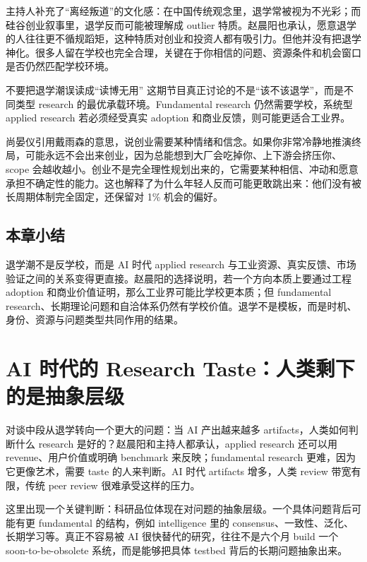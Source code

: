 \documentclass[a4paper]{article}
\begin{document}
主持人补充了“离经叛道”的文化感：在中国传统观念里，退学常被视为不光彩；而硅谷创业叙事里，退学反而可能被理解成 outlier 特质。赵晨阳也承认，愿意退学的人往往更不循规蹈矩，这种特质对创业和投资人都有吸引力。但他并没有把退学神化。很多人留在学校也完全合理，关键在于你相信的问题、资源条件和机会窗口是否仍然匹配学校环境。

\begin{warningbox}{不要把退学潮误读成“读博无用”}
这期节目真正讨论的不是“该不该退学”，而是不同类型 research 的最优承载环境。Fundamental research 仍然需要学校，系统型 applied research 若必须经受真实 adoption 和商业反馈，则可能更适合工业界。
\end{warningbox}

尚晏仪引用戴雨森的意思，说创业需要某种情绪和信念。如果你非常冷静地推演终局，可能永远不会出来创业，因为总能想到大厂会吃掉你、上下游会挤压你、scope 会越收越小。创业不是完全理性规划出来的，它需要某种相信、冲动和愿意承担不确定性的能力。这也解释了为什么年轻人反而可能更敢跳出来：他们没有被长周期体制完全固定，还保留对 1\% 机会的偏好。

\subsection{本章小结}

退学潮不是反学校，而是 AI 时代 applied research 与工业资源、真实反馈、市场验证之间的关系变得更直接。赵晨阳的选择说明，若一个方向本质上要通过工程 adoption 和商业价值证明，那么工业界可能比学校更本质；但 fundamental research、长期理论问题和自洽体系仍然有学校价值。退学不是模板，而是时机、身份、资源与问题类型共同作用的结果。

\section{AI 时代的 Research Taste：人类剩下的是抽象层级}

对谈中段从退学转向一个更大的问题：当 AI 产出越来越多 artifacts，人类如何判断什么 research 是好的？赵晨阳和主持人都承认，applied research 还可以用 revenue、用户价值或明确 benchmark 来反映；fundamental research 更难，因为它更像艺术，需要 taste 的人来判断。AI 时代 artifacts 增多，人类 review 带宽有限，传统 peer review 很难承受这样的压力。

这里出现一个关键判断：科研品位体现在对问题的抽象层级。一个具体问题背后可能有更 fundamental 的结构，例如 intelligence 里的 consensus、一致性、泛化、长期学习等。真正不容易被 AI 很快替代的研究，往往不是六个月 build 一个 soon-to-be-obsolete 系统，而是能够把具体 testbed 背后的长期问题抽象出来。
\end{document}
